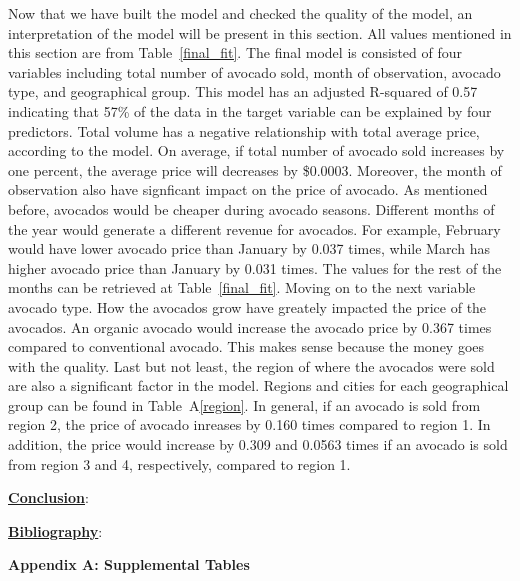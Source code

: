 \documentclass[11pt]{article}\usepackage[]{graphicx}\usepackage[]{color}
\begin{document}
\noindent Now that we have built the model and checked the quality of the model, an interpretation of the model will be present in this section. All values mentioned in this section are from Table~\ref{final_fit}. The final model is consisted of four variables including total number of avocado sold, month of observation, avocado type, and geographical group. This model has an adjusted R-squared of 0.57 indicating that 57\% of the data in the target variable can be explained by four predictors. Total volume has a negative relationship with total average price, according to the model. On average, if total number of avocado sold increases by one percent, the average price will decreases by \$0.0003. Moreover, the month of observation also have signficant impact on the price of avocado. As mentioned before, avocados would be cheaper during avocado seasons. Different months of the year would generate a different revenue for avocados. For example, February would have lower avocado price than January by 0.037 times, while March has higher avocado price than January by 0.031 times. The values for the rest of the months can be retrieved at Table~\ref{final_fit}. Moving on to the next variable avocado type. How the avocados grow have greately impacted the price of the avocados. An organic avocado would increase the avocado price by 0.367 times compared to conventional avocado. This makes sense because the money goes with the quality. Last but not least, the region of where the avocados were sold are also a significant factor in the model. Regions and cities for each geographical group can be found in Table~A\ref{region}. In general, if an avocado is sold from region 2, the price of avocado inreases by 0.160 times compared to region 1. In addition, the price would increase by 0.309 and 0.0563 times if an avocado is sold from region 3 and 4, respectively, compared to region 1.
\hfill \break


\noindent\textbf{\underline{Conclusion}}: 
\hfill \break


\clearpage
\noindent\textbf{\underline{Bibliography}}:
\hfill \break


\clearpage
\newpage
\noindent \Large{{\bf Appendix A: Supplemental Tables}}
\end{document}
